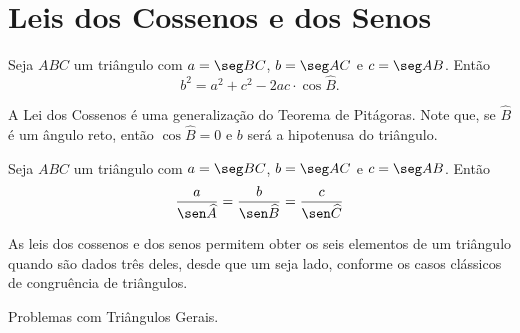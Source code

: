 \section{Leis dos Cossenos e dos Senos}

\begin{theorem}
    Seja $ABC$ um triângulo com $a = \seg BC$, $b = \seg AC$ e $c = \seg
AB$. Então
$$b^2 = a^2 + c^2 - 2 ac \cdot \cos \widehat B.$$
\end{theorem}

\begin{remark}
    A Lei dos Cossenos é uma generalização do Teorema de Pitágoras. Note
que, se $\widehat B$ é um ângulo reto, então $\cos \widehat B = 0$ e
$b$ será a hipotenusa do triângulo.
\end{remark}

\begin{theorem}
    Seja $ABC$ um triângulo com $a = \seg BC$, $b = \seg AC$ e $c = \seg
AB$. Então
$$\frac a {\sen \widehat A} = \frac b {\sen \widehat B} = \frac c {\sen \widehat C}$$
\end{theorem}

As leis dos cossenos e dos senos permitem obter os seis elementos de
um triângulo quando são dados três deles, desde que um seja lado,
conforme os casos clássicos de congruência de triângulos.

\begin{onlineact}
    {Problemas com Triângulos Gerais}.
\end{onlineact}